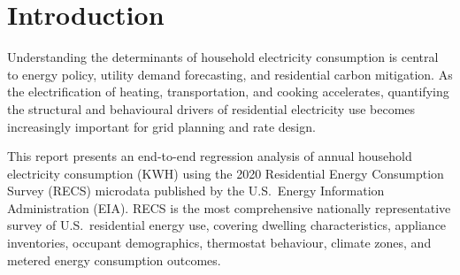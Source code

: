 \documentclass[10pt,twocolumn]{article}
\begin{document}

\section{Introduction}

Understanding the determinants of household electricity consumption is central to energy policy, utility demand forecasting, and residential carbon mitigation. As the electrification of heating, transportation, and cooking accelerates, quantifying the structural and behavioural drivers of residential electricity use becomes increasingly important for grid planning and rate design.

This report presents an end-to-end regression analysis of annual household electricity consumption (KWH) using the 2020 Residential Energy Consumption Survey (RECS) microdata published by the U.S.\ Energy Information Administration (EIA). RECS is the most comprehensive nationally representative survey of U.S.\ residential energy use, covering dwelling characteristics, appliance inventories, occupant demographics, thermostat behaviour, climate zones, and metered energy consumption outcomes.
\end{document}
